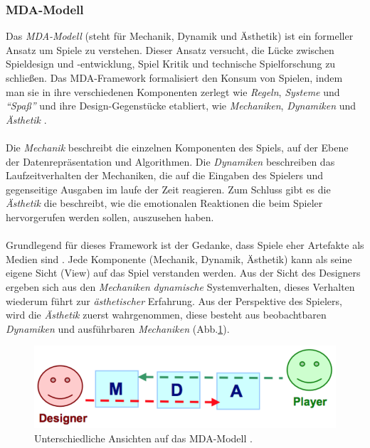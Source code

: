 \documentclass[a4paper,12pt,twoside]{scrartcl}
\begin{document}
\subsubsection{MDA-Modell}
Das \textit{MDA-Modell} (steht für Mechanik, Dynamik und Ästhetik) ist ein formeller Ansatz um Spiele zu verstehen. Dieser Ansatz versucht, die Lücke zwischen Spieldesign und -entwicklung, Spiel Kritik und technische Spielforschung zu schließen. Das MDA-Framework formalisiert den Konsum von Spielen, indem man sie in ihre verschiedenen Komponenten zerlegt wie \textit{Regeln}, \textit{Systeme} und \textit{\enquote{Spaß}} und ihre Design-Gegenstücke etabliert, wie \textit{Mechaniken}, \textit{Dynamiken} und \textit{Ästhetik} \cite{Hunicke2004}.
\\\\
Die \textit{Mechanik} beschreibt die einzelnen Komponenten des Spiels, auf der Ebene der Datenrepräsentation und Algorithmen. Die \textit{Dynamiken} beschreiben das Laufzeitverhalten der Mechaniken, die auf die Eingaben des Spielers und gegenseitige Ausgaben im laufe der Zeit reagieren. Zum Schluss gibt es die \textit{Ästhetik} die beschreibt, wie die emotionalen Reaktionen die beim Spieler hervorgerufen werden sollen, auszusehen haben.
\\\\
Grundlegend für dieses Framework ist der Gedanke, dass Spiele eher Artefakte als Medien sind \cite{Hunicke2004}. Jede Komponente (Mechanik, Dynamik, Ästhetik) kann als seine eigene Sicht (View) auf das Spiel verstanden werden. Aus der Sicht des Designers ergeben sich aus den \textit{Mechaniken} \textit{dynamische} Systemverhalten, dieses Verhalten wiederum führt zur \textit{ästhetischer} Erfahrung. Aus der Perspektive des Spielers, wird die \textit{Ästhetik} zuerst wahrgenommen, diese besteht aus beobachtbaren \textit{Dynamiken} und ausführbaren \textit{Mechaniken} (Abb.\ref{MDAModelBild}). 
\begin{figure}[h!]
\begin{center}
\includegraphics[scale = 1.0]{Bilder/MDAModel.eps}
\caption{Unterschiedliche Ansichten auf das MDA-Modell \cite{Hunicke2004}.}
\label{MDAModelBild}
\end{center}
\end{figure}
\end{document}

